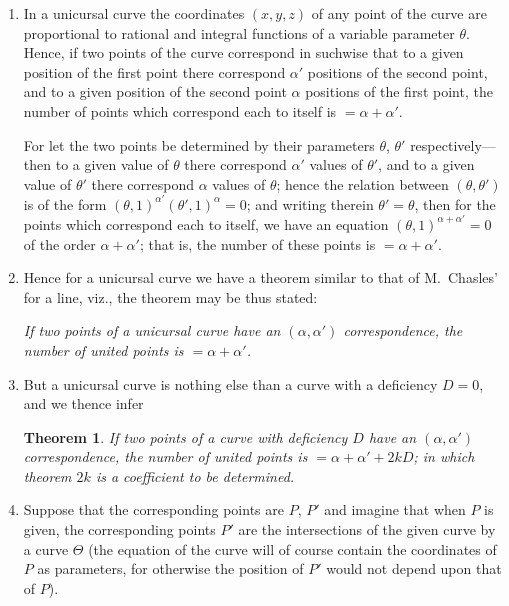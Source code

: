 \documentclass[12pt,a4paper]{article}
\theoremstyle{plain}
\newtheorem{theorem}{Theorem}
\theoremstyle{definition}
\theoremstyle{remark}
\begin{document}
\begin{enumerate}[label=\arabic*.]
\item In a unicursal curve the coordinates $(x,y,z)$ of any point of the curve are proportional to rational and integral functions of a variable parameter $\theta$. Hence, if two points of the curve correspond in suchwise that to a given position of the first point there correspond $\alpha'$ positions of the second point, and to a given position of the second point $\alpha$ positions of the first point, the number of points which correspond each to itself is $= \alpha + \alpha'$.

For let the two points be determined by their parameters $\theta$, $\theta'$ respectively---then to a given value of $\theta$ there correspond $\alpha'$ values of $\theta'$, and to a given value of $\theta'$ there correspond $\alpha$ values of $\theta$; hence the relation between $(\theta, \theta')$ is of the form $(\theta, 1)^{\alpha'}(\theta', 1)^{\alpha} = 0$; and writing therein $\theta' = \theta$, then for the points which correspond each to itself, we have an equation $(\theta, 1)^{\alpha+\alpha'} = 0$ of the order $\alpha + \alpha'$; that is, the number of these points is $= \alpha + \alpha'$.

\item Hence for a unicursal curve we have a theorem similar to that of M.~Chasles' for a line, viz., the theorem may be thus stated:

\emph{If two points of a unicursal curve have an $(\alpha, \alpha')$ correspondence, the number of united points is $= \alpha + \alpha'$.}

\item But a unicursal curve is nothing else than a curve with a deficiency $D = 0$, and we thence infer

\begin{theorem}
If two points of a curve with deficiency $D$ have an $(\alpha, \alpha')$ correspondence, the number of united points is $= \alpha + \alpha' + 2kD$; in which theorem $2k$ is a coefficient to be determined.
\end{theorem}

\item Suppose that the corresponding points are $P$, $P'$ and imagine that when $P$ is given, the corresponding points $P'$ are the intersections of the given curve by a curve $\Theta$ (the equation of the curve will of course contain the coordinates of $P$ as parameters, for otherwise the position of $P'$ would not depend upon that of $P$).


\end{enumerate}
\end{document}
